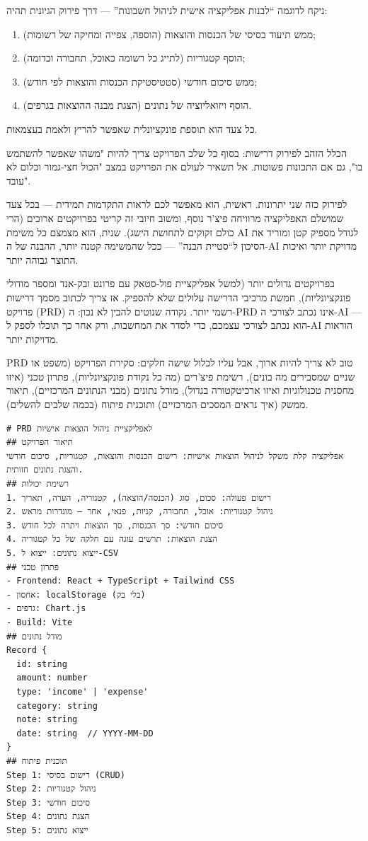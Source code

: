 ניקח לדוגמה “לבנות אפליקציה אישית לניהול חשבונות” — דרך פירוק הגיונית תהיה:

\begin{enumerate}
  \item ממש תיעוד בסיסי של הכנסות והוצאות (הוספה, צפייה ומחיקה של רשומות);
  \item הוסף קטגוריות (לתייג כל רשומה כאוכל, תחבורה וכדומה);
  \item ממש סיכום חודשי (סטטיסטיקת הכנסות והוצאות לפי חודש);
  \item הוסף ויזואליזציה של נתונים (הצגת מבנה ההוצאות בגרפים).
\end{enumerate}

כל צעד הוא תוספת פונקציונלית שאפשר להריץ ולאמת בעצמאות.

הכלל הזהב לפירוק דרישות: בסוף כל שלב הפרויקט צריך להיות "משהו שאפשר להשתמש בו", גם אם התכונות פשוטות. אל תשאיר לעולם את הפרויקט במצב "הכול חצי-גמור וכלום לא עובד".

לפירוק כזה שני יתרונות. ראשית, הוא מאפשר לכם לראות התקדמות תמידית — בכל צעד שמושלם האפליקציה מרוויחה פיצ'ר נוסף, ומשוב חיובי זה קריטי בפרויקטים ארוכים (הרי כולם זקוקים לתחושת הישג). שנית, הוא מצמצם כל משימת AI לגודל מספיק קטן ומוריד את הסיכון ל“סטיית הבנה” — ככל שהמשימה קטנה יותר, ההבנה של ה-AI מדויקת יותר ואיכות התוצר גבוהה יותר.


בפרויקטים גדולים יותר (למשל אפליקציית פול-סטאק עם פרונט ובק-אנד ומספר מודולי פונקציונליות), חמשת מרכיבי הדרישה עלולים שלא להספיק. אז צריך לכתוב מסמך דרישות פרויקט (PRD) רשמי יותר. נקודה שנוטים להבין לא נכון: ה-PRD אינו נכתב לצורכי ה-AI — הוא נכתב לצורכי עצמכם, כדי לסדר את המחשבות, ורק אחר כך תוכלו לספק ל-AI הוראות מדויקות יותר.

PRD טוב לא צריך להיות ארוך, אבל עליו לכלול שישה חלקים: סקירת הפרויקט (משפט או שניים שמסבירים מה בונים), רשימת פיצ'רים (מה כל נקודת פונקציונליות), פתרון טכני (איזו מחסנית טכנולוגיות ואיזו ארכיטקטורה בגדול), מודל נתונים (מבני הנתונים המרכזיים), תיאור ממשק (איך נראים המסכים המרכזיים) ותוכנית פיתוח (בכמה שלבים להשלים).

\begin{lstlisting}
# PRD לאפליקציית ניהול הוצאות אישיות
## תיאור הפרויקט
אפליקציה קלת משקל לניהול הוצאות אישיות: רישום הכנסות והוצאות, קטגוריות, סיכום חודשי והצגת נתונים חזותית.
## רשימת יכולות
1. רישום פעולה: סכום, סוג (הכנסה/הוצאה), קטגוריה, הערה, תאריך
2. ניהול קטגוריות: אוכל, תחבורה, קניות, פנאי, אחר – מוגדרות מראש
3. סיכום חודשי: סך הכנסות, סך הוצאות ויתרה לכל חודש
4. הצגת הוצאות: תרשים עוגה עם חלקה של כל קטגוריה
5. ייצוא נתונים: ייצוא ל-CSV
## פתרון טכני
- Frontend: React + TypeScript + Tailwind CSS
- אחסון: localStorage (בלי בק)
- גרפים: Chart.js
- Build: Vite
## מודל נתונים
Record {
  id: string
  amount: number
  type: 'income' | 'expense'
  category: string
  note: string
  date: string  // YYYY-MM-DD
}
## תוכנית פיתוח
Step 1: רישום בסיסי (CRUD)
Step 2: ניהול קטגוריות
Step 3: סיכום חודשי
Step 4: הצגת נתונים
Step 5: ייצוא נתונים
\end{lstlisting}

